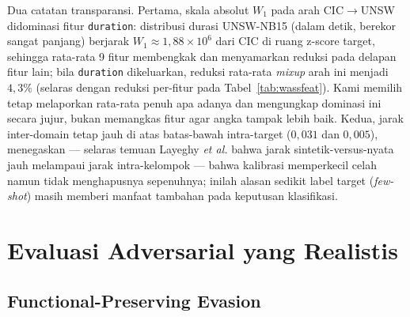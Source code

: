 \documentclass[11pt,a4paper]{article}
\begin{document}
Dua catatan transparansi. Pertama, skala absolut $W_1$ pada arah
CIC$\rightarrow$UNSW didominasi fitur \texttt{duration}: distribusi durasi
UNSW-NB15 (dalam detik, berekor sangat panjang) berjarak $W_1 \approx
1{,}88\times10^{6}$ dari CIC di ruang z-score target, sehingga rata-rata 9 fitur
membengkak dan menyamarkan reduksi pada delapan fitur lain; bila \texttt{duration}
dikeluarkan, reduksi rata-rata \emph{mixup} arah ini menjadi $4{,}3\%$ (selaras
dengan reduksi per-fitur pada Tabel~\ref{tab:wassfeat}). Kami memilih tetap
melaporkan rata-rata penuh apa adanya dan mengungkap dominasi ini secara jujur,
bukan memangkas fitur agar angka tampak lebih baik. Kedua, jarak inter-domain
tetap jauh di atas batas-bawah intra-target ($0{,}031$ dan $0{,}005$),
menegaskan --- selaras temuan Layeghy \emph{et al.} bahwa jarak
sintetik-versus-nyata jauh melampaui jarak intra-kelompok --- bahwa kalibrasi
memperkecil celah namun tidak menghapusnya sepenuhnya; inilah alasan sedikit
label target (\emph{few-shot}) masih memberi manfaat tambahan pada keputusan
klasifikasi.

\ifadversarial
\section{Evaluasi Adversarial yang Realistis}

\subsection{Functional-Preserving Evasion}
\label{sec:fpe}
\end{document}
